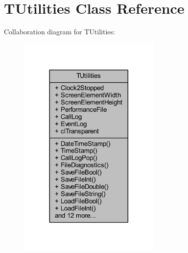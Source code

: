 \hypertarget{class_t_utilities}{}\section{T\+Utilities Class Reference}
\label{class_t_utilities}


Collaboration diagram for T\+Utilities\+:\nopagebreak
\begin{figure}[H]
\begin{center}
\leavevmode
\includegraphics[width=200pt]{class_t_utilities__coll__graph}
\end{center}
\end{figure}
